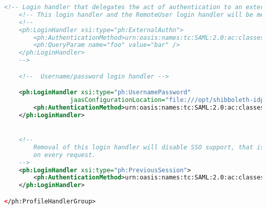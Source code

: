 \begin{lstlisting}[language=xml]
    <!-- Login handler that delegates the act of authentication to an external system. -->
    <!-- This login handler and the RemoteUser login handler will be merged in the next major release. -->
    <!--
    <ph:LoginHandler xsi:type="ph:ExternalAuthn">
        <ph:AuthenticationMethod>urn:oasis:names:tc:SAML:2.0:ac:classes:unspecified</ph:AuthenticationMethod>
        <ph:QueryParam name="foo" value="bar" />
    </ph:LoginHandler>
    -->

    <!--  Username/password login handler -->

    <ph:LoginHandler xsi:type="ph:UsernamePassword"
                  jaasConfigurationLocation="file:///opt/shibboleth-idp/conf/login.config">
        <ph:AuthenticationMethod>urn:oasis:names:tc:SAML:2.0:ac:classes:PasswordProtectedTransport</ph:AuthenticationMethod>
    </ph:LoginHandler>


    <!--
        Removal of this login handler will disable SSO support, that is it will require the user to authenticate
        on every request.
    -->
    <ph:LoginHandler xsi:type="ph:PreviousSession">
        <ph:AuthenticationMethod>urn:oasis:names:tc:SAML:2.0:ac:classes:PreviousSession</ph:AuthenticationMethod>
    </ph:LoginHandler>

</ph:ProfileHandlerGroup>
\end{lstlisting}

